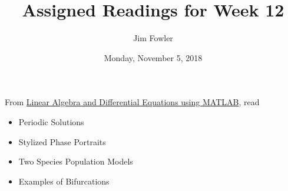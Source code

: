\documentclass{homework}
\author{Jim Fowler}
\title{Assigned Readings for Week 12}
\date{Monday, November 5, 2018}
\begin{document}
\maketitle

From \href{/courses/43735/files/folder/textbooks}{Linear Algebra and Differential Equations using MATLAB}, read 
\begin{itemize}
\item {} Periodic Solutions
\item {} Stylized Phase Portraits
\item {} Two Species Population Models
\item {} Examples of Bifurcations
\end{itemize}
\end{document}
